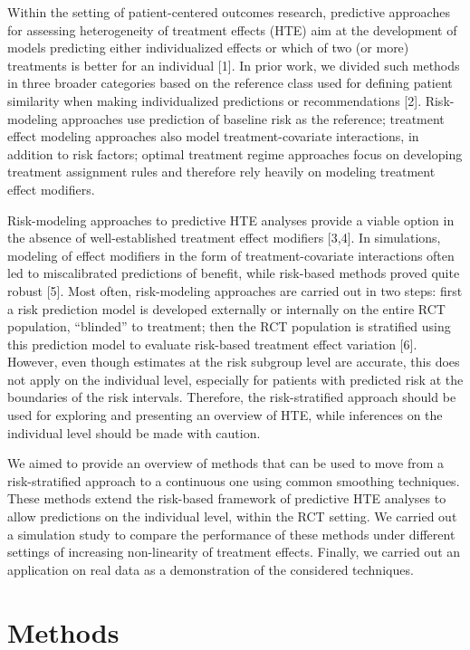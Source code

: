\documentclass{article}
\begin{document}
Within the setting of patient-centered outcomes research, predictive
approaches for assessing heterogeneity of treatment effects (HTE) aim at
the development of models predicting either individualized effects or
which of two (or more) treatments is better for an individual {[}1{]}.
In prior work, we divided such methods in three broader categories based
on the reference class used for defining patient similarity when making
individualized predictions or recommendations {[}2{]}. Risk-modeling
approaches use prediction of baseline risk as the reference; treatment
effect modeling approaches also model treatment-covariate interactions,
in addition to risk factors; optimal treatment regime approaches focus
on developing treatment assignment rules and therefore rely heavily on
modeling treatment effect modifiers.

Risk-modeling approaches to predictive HTE analyses provide a viable
option in the absence of well-established treatment effect modifiers
{[}3,4{]}. In simulations, modeling of effect modifiers in the form of
treatment-covariate interactions often led to miscalibrated predictions
of benefit, while risk-based methods proved quite robust {[}5{]}. Most
often, risk-modeling approaches are carried out in two steps: first a
risk prediction model is developed externally or internally on the
entire RCT population, ``blinded'' to treatment; then the RCT population
is stratified using this prediction model to evaluate risk-based
treatment effect variation {[}6{]}. However, even though estimates at
the risk subgroup level are accurate, this does not apply on the
individual level, especially for patients with predicted risk at the
boundaries of the risk intervals. Therefore, the risk-stratified
approach should be used for exploring and presenting an overview of HTE,
while inferences on the individual level should be made with caution.

We aimed to provide an overview of methods that can be used to move from
a risk-stratified approach to a continuous one using common smoothing
techniques. These methods extend the risk-based framework of predictive
HTE analyses to allow predictions on the individual level, within the
RCT setting. We carried out a simulation study to compare the
performance of these methods under different settings of increasing
non-linearity of treatment effects. Finally, we carried out an
application on real data as a demonstration of the considered
techniques.

\hypertarget{methods}{%
\section{Methods}\label{methods}}
\end{document}
